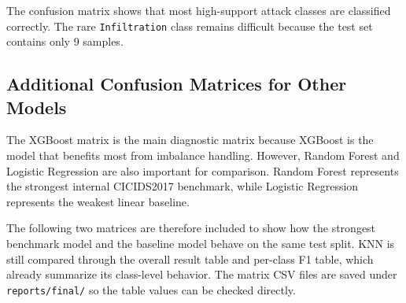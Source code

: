 \documentclass[12pt,a4paper]{article}
\begin{document}
The confusion matrix shows that most high-support attack classes are classified correctly. The rare \texttt{Infiltration} class remains difficult because the test set contains only 9 samples.

\subsection{Additional Confusion Matrices for Other Models}

The XGBoost matrix is the main diagnostic matrix because XGBoost is the model that benefits most from imbalance handling. However, Random Forest and Logistic Regression are also important for comparison. Random Forest represents the strongest internal CICIDS2017 benchmark, while Logistic Regression represents the weakest linear baseline.

The following two matrices are therefore included to show how the strongest benchmark model and the baseline model behave on the same test split. KNN is still compared through the overall result table and per-class F1 table, which already summarize its class-level behavior. The matrix CSV files are saved under \texttt{reports/final/} so the table values can be checked directly.

\begin{table}[H]
\centering
\caption{Random Forest confusion matrix without imbalance handling.}
\scriptsize
\setlength{\tabcolsep}{2pt}
\end{table}
\end{document}
